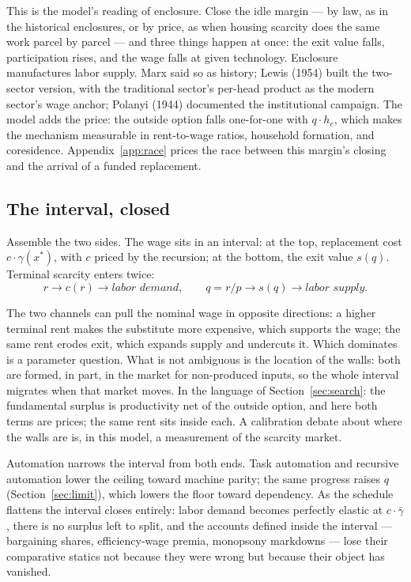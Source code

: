 \documentclass[12pt]{article}
\theoremstyle{plain}
\begin{document}
This is the model's reading of enclosure. Close the idle margin --- by law, as in the historical enclosures, or by price, as when housing scarcity does the same work parcel by parcel --- and three things happen at once: the exit value falls, participation rises, and the wage falls at given technology. Enclosure manufactures labor supply. Marx said so as history; Lewis (1954) built the two-sector version, with the traditional sector's per-head product as the modern sector's wage anchor; Polanyi (1944) documented the institutional campaign. The model adds the price: the outside option falls one-for-one with $q\cdot h_e$, which makes the mechanism measurable in rent-to-wage ratios, household formation, and coresidence. Appendix~\ref{app:race} prices the race between this margin's closing and the arrival of a funded replacement.

\subsection{The interval, closed}\label{sec:interval}

Assemble the two sides. The wage sits in an interval: at the top, replacement cost $c\cdot \gamma (x^*)$, with $c$ priced by the recursion; at the bottom, the exit value $s(q)$. Terminal scarcity enters twice:
\[
r \to c(r) \to \textit{labor demand},\qquad q = r/p \to s(q) \to \textit{labor supply}.
\]

The two channels can pull the nominal wage in opposite directions: a higher terminal rent makes the substitute more expensive, which supports the wage; the same rent erodes exit, which expands supply and undercuts it. Which dominates is a parameter question. What is not ambiguous is the location of the walls: both are formed, in part, in the market for non-produced inputs, so the whole interval migrates when that market moves. In the language of Section~\ref{sec:search}: the fundamental surplus is productivity net of the outside option, and here both terms are prices; the same rent sits inside each. A calibration debate about where the walls are is, in this model, a measurement of the scarcity market.

Automation narrows the interval from both ends. Task automation and recursive automation lower the ceiling toward machine parity; the same progress raises $q$ (Section~\ref{sec:limit}), which lowers the floor toward dependency. As the schedule flattens the interval closes entirely: labor demand becomes perfectly elastic at $c\cdot \bar{\gamma}$, there is no surplus left to split, and the accounts defined inside the interval --- bargaining shares, efficiency-wage premia, monopsony markdowns --- lose their comparative statics not because they were wrong but because their object has vanished.
\end{document}
